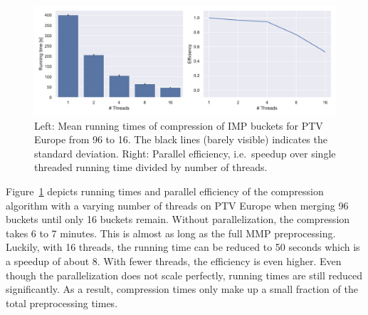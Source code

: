 \documentclass[a4paper,UKenglish,cleveref, autoref, thm-restate,anonymous]{lipics-v2021}
\begin{document}
\begin{figure}
\centering
\includegraphics[width=\linewidth]{fig/parallelization.pdf}
\caption{
Left: Mean running times of compression of IMP buckets for PTV Europe from 96 to 16. The black lines (barely visible) indicates the standard deviation.
Right: Parallel efficiency, i.e.\ speedup over single threaded running time divided by number of threads.
}\label{fig:comp_par}
\end{figure}

Figure~\ref{fig:comp_par} depicts running times and parallel efficiency of the compression algorithm with a varying number of threads on PTV Europe when merging 96 buckets until only 16 buckets remain.
Without parallelization, the compression takes 6 to 7 minutes.
This is almost as long as the full MMP preprocessing.
Luckily, with 16 threads, the running time can be reduced to 50 seconds which is a speedup of about 8.
With fewer threads, the efficiency is even higher.
Even though the parallelization does not scale perfectly, running times are still reduced significantly.
As a result, compression times only make up a small fraction of the total preprocessing times.




\end{document}
